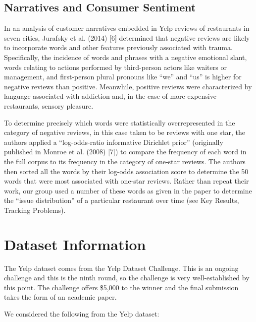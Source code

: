 \subsection{Narratives and Consumer Sentiment}

\quad In an analysis of customer narratives embedded in Yelp reviews of restaurants in seven cities, Jurafsky et al. (2014) [6] determined that negative reviews are likely to incorporate words and other features previously associated with trauma. Specifically, the incidence of words and phrases with a negative emotional slant, words relating to actions performed by third-person actors like waiters or management, and first-person plural pronouns like “we” and “us” is higher for negative reviews than positive. Meanwhile, positive reviews were characterized by language associated with addiction and, in the case of more expensive restaurants, sensory pleasure.

\quad To determine precisely which words were statistically overrepresented in the category of negative reviews, in this case taken to be reviews with one star, the authors applied a “log-odds-ratio informative Dirichlet prior” (originally published in Monroe et al. (2008) [7]) to compare the frequency of each word in the full corpus to its frequency in the category of one-star reviews. The authors then sorted all the words by their log-odds association score to determine the 50 words that were most associated with one-star reviews. Rather than repeat their work, our group used a number of these words as given in the paper to determine the “issue distribution” of a particular restaurant over time (see Key Results, Tracking Problems).

\section{Dataset Information}

\quad The Yelp dataset comes from the Yelp Dataset Challenge. This is an ongoing challenge and this is the ninth round, so the challenge is very well-established by this point. The challenge offers \$5,000 to the winner and the final submission takes the form of an academic paper.

\quad We considered the following from the Yelp dataset:

